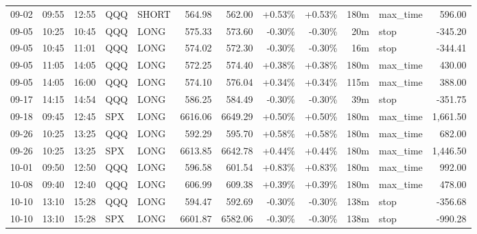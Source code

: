 \documentclass[11pt,a4paper,twoside]{article}
\begin{document}
\begin{center}
\begin{longtable}{>{\color{txtmain}}l l l l l r r r r r >{\color{txtmain}}l r}
09-02 & 09:55 & 12:55 & QQQ & SHORT & 564.98 & 562.00 & \textcolor{wingreen}{+0.53\%} & \textcolor{wingreen}{+0.53\%} & 180m & max\_time & \textcolor{wingreen}{596.00} \\
09-05 & 10:25 & 10:45 & QQQ & LONG & 575.33 & 573.60 & \textcolor{lossred}{-0.30\%} & \textcolor{lossred}{-0.30\%} & 20m & stop & \textcolor{lossred}{-345.20} \\
09-05 & 10:45 & 11:01 & QQQ & LONG & 574.02 & 572.30 & \textcolor{lossred}{-0.30\%} & \textcolor{lossred}{-0.30\%} & 16m & stop & \textcolor{lossred}{-344.41} \\
09-05 & 11:05 & 14:05 & QQQ & LONG & 572.25 & 574.40 & \textcolor{wingreen}{+0.38\%} & \textcolor{wingreen}{+0.38\%} & 180m & max\_time & \textcolor{wingreen}{430.00} \\
09-05 & 14:05 & 16:00 & QQQ & LONG & 574.10 & 576.04 & \textcolor{wingreen}{+0.34\%} & \textcolor{wingreen}{+0.34\%} & 115m & max\_time & \textcolor{wingreen}{388.00} \\
09-17 & 14:15 & 14:54 & QQQ & LONG & 586.25 & 584.49 & \textcolor{lossred}{-0.30\%} & \textcolor{lossred}{-0.30\%} & 39m & stop & \textcolor{lossred}{-351.75} \\
09-18 & 09:45 & 12:45 & SPX & LONG & 6616.06 & 6649.29 & \textcolor{wingreen}{+0.50\%} & \textcolor{wingreen}{+0.50\%} & 180m & max\_time & \textcolor{wingreen}{1,661.50} \\
09-26 & 10:25 & 13:25 & QQQ & LONG & 592.29 & 595.70 & \textcolor{wingreen}{+0.58\%} & \textcolor{wingreen}{+0.58\%} & 180m & max\_time & \textcolor{wingreen}{682.00} \\
09-26 & 10:25 & 13:25 & SPX & LONG & 6613.85 & 6642.78 & \textcolor{wingreen}{+0.44\%} & \textcolor{wingreen}{+0.44\%} & 180m & max\_time & \textcolor{wingreen}{1,446.50} \\
10-01 & 09:50 & 12:50 & QQQ & LONG & 596.58 & 601.54 & \textcolor{wingreen}{+0.83\%} & \textcolor{wingreen}{+0.83\%} & 180m & max\_time & \textcolor{wingreen}{992.00} \\
10-08 & 09:40 & 12:40 & QQQ & LONG & 606.99 & 609.38 & \textcolor{wingreen}{+0.39\%} & \textcolor{wingreen}{+0.39\%} & 180m & max\_time & \textcolor{wingreen}{478.00} \\
10-10 & 13:10 & 15:28 & QQQ & LONG & 594.47 & 592.69 & \textcolor{lossred}{-0.30\%} & \textcolor{lossred}{-0.30\%} & 138m & stop & \textcolor{lossred}{-356.68} \\
10-10 & 13:10 & 15:28 & SPX & LONG & 6601.87 & 6582.06 & \textcolor{lossred}{-0.30\%} & \textcolor{lossred}{-0.30\%} & 138m & stop & \textcolor{lossred}{-990.28} \\

\end{longtable}
\end{center}
\end{document}

